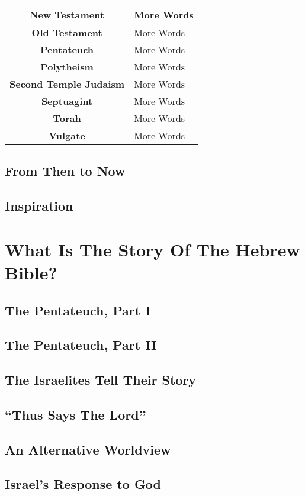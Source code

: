 \documentclass{report}
\begin{document}
\begin{tabular}{| c | l |}
            \textbf{New Testament} & More Words \\ \hline
            \textbf{Old Testament} & More Words \\ \hline
            \textbf{Pentateuch} & More Words \\ \hline
            \textbf{Polytheism} & More Words \\ \hline
            \textbf{Second Temple Judaism} & More Words \\ \hline
            \textbf{Septuagint} & More Words \\ \hline
            \textbf{Torah} & More Words \\ \hline
            \textbf{Vulgate} & More Words \\ \hline
            \hline
        \end{tabular}
    \chapter{From Then to Now}
    \chapter{Inspiration}

\part{What Is The Story Of The Hebrew Bible?}

    \chapter{The Pentateuch, Part I}
    \chapter{The Pentateuch, Part II}
    \chapter{The Israelites Tell Their Story}
    \chapter{``Thus Says The Lord''}
    \chapter{An Alternative Worldview}
    \chapter{Israel's Response to God}
\end{document}
